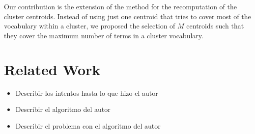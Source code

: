 \documentclass[runningheads]{llncs}
\begin{document}
Our contribution is the extension of the method for the recomputation of  the cluster centroids. Instead of using just one centroid that tries to
cover most of the vocabulary within a cluster, we proposed the selection
of $M$ centroids such that they cover the maximum number of terms 
in a cluster vocabulary.










%
%
%
%
%
%

\section{Related Work}



\begin{itemize}
\item Describir los intentos hasta lo que hizo el autor
\item Describir el algoritmo del autor
\item Describir el problema con el algoritmo del autor
\end{itemize}
\end{document}
